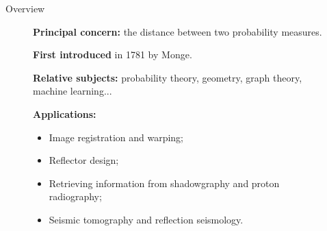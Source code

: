 \begin{frame}{Overview}
    \scriptsize
    \vspace{-1.5em}
    \begin{figure}
        \captionsetup{font=tiny}
        \begin{minipage}[t]{0.6\linewidth}
            \vspace{0pt}
            \textbf{Principal concern:} the distance between two probability measures.

            \textbf{First introduced} in 1781 by Monge.

            \textbf{Relative subjects:} probability theory, geometry, graph theory, machine learning...

            \textbf{Applications:}
            \begin{itemize}
                \item Image registration and warping;
                \item Reflector design;
                \item Retrieving information from shadowgraphy and proton radiography;
                \item Seismic tomography and reflection seismology.
            \end{itemize}


\end{minipage}
\end{figure}
\end{frame}
